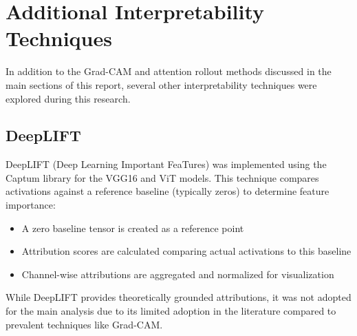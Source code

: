 \documentclass[a4paper,12pt]{report}
\begin{document}


\section{Additional Interpretability Techniques}
\label{appendix:add_interpret}

In addition to the Grad-CAM and attention rollout methods discussed in the main sections of this report, several other interpretability techniques were explored during this research.

\subsection{DeepLIFT}

DeepLIFT (Deep Learning Important FeaTures)  was implemented using the Captum library for the VGG16 and ViT models. This technique compares activations against a reference baseline (typically zeros) to determine feature importance:

\begin{itemize}
\item A zero baseline tensor is created as a reference point
\item Attribution scores are calculated comparing actual activations to this baseline
\item Channel-wise attributions are aggregated and normalized for visualization
\end{itemize}

While DeepLIFT provides theoretically grounded attributions, it was not adopted for the main analysis due to its limited adoption in the literature compared to prevalent techniques like Grad-CAM.
\end{document}
